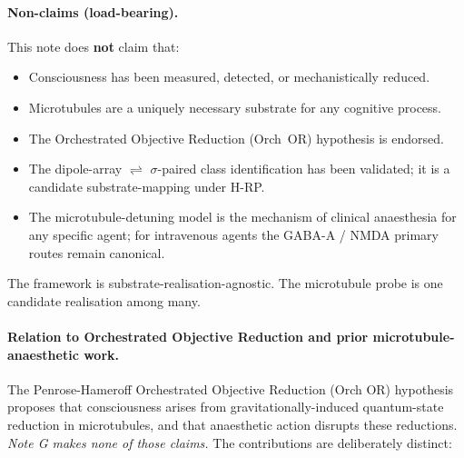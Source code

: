 \documentclass[11pt,a4paper]{article}
\begin{document}
\paragraph{Non-claims (load-bearing).}
This note does \textbf{not} claim that:
\begin{itemize}\itemsep0pt
  \item Consciousness has been measured, detected, or mechanistically reduced.
  \item Microtubules are a uniquely necessary substrate for any cognitive process.
  \item The Orchestrated Objective Reduction (Orch~OR) hypothesis is endorsed.
  \item The dipole-array $\rightleftharpoons$ $\sigma$-paired class identification has been validated; it is a candidate substrate-mapping under H-RP.
  \item The microtubule-detuning model is the mechanism of clinical anaesthesia for any specific agent; for intravenous agents the GABA-A / NMDA primary routes remain canonical.
\end{itemize}
The framework is substrate-realisation-agnostic. The microtubule probe is one candidate realisation among many.

\paragraph{Relation to Orchestrated Objective Reduction and prior microtubule-anaesthetic work.}
The Penrose-Hameroff Orchestrated Objective Reduction (Orch OR) hypothesis
\cite{HameroffPenrose1996, HameroffTuszynski2003} proposes that consciousness
arises from gravitationally-induced quantum-state reduction in microtubules,
and that anaesthetic action disrupts these reductions. \emph{Note G makes none
of those claims.} The contributions are deliberately distinct:
\end{document}
